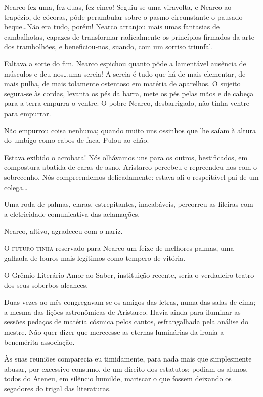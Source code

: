 Nearco fez uma, fez duas, fez cinco! Seguiu{}-se
uma viravolta, e Nearco ao trapézio, de cócoras, pôde perambular sobre
o pasmo circunstante o pausado beque\ldots Não era tudo, porém! Nearco
arranjou mais umas fantasias de cambalhotas, capazes de transformar
radicalmente os princípios firmados da arte dos trambolhões, e
beneficiou{}-nos, suando, com um sorriso triunfal. 

Faltava a sorte do
fim. Nearco espichou quanto pôde a lamentável ausência de músculos e
deu{}-nos\ldots uma sereia! A sereia é tudo que há de mais elementar, de
mais pulha, de mais tolamente ostentoso em matéria de aparelhos. O
sujeito segura{}-se às cordas, levanta os pés da barra, mete os pés
pelas mãos e de cabeça para a terra empurra o ventre. O pobre Nearco,
desbarrigado, não tinha ventre para empurrar. 

Não empurrou coisa
nenhuma; quando muito uns ossinhos que lhe saíam à altura do umbigo
como cabos de faca. Pulou ao chão. 

Estava exibido o acrobata! Nós
olhávamos uns para os outros, bestificados, em compostura abatida de
caras{}-de{}-asno. Aristarco percebeu e repreendeu{}-nos com o
sobrecenho. Nós compreendemos delicadamente: estava ali o respeitável
pai de um colega\ldots 

Uma roda de palmas, claras, estrepitantes, inacabáveis, percorreu 
as fileiras com a eletricidade comunicativa das aclamações. 

Nearco, altivo, agradeceu com o nariz. 

\sectionitem

\noindent\textsc{O futuro tinha} reservado para Nearco um feixe de melhores palmas, uma
galhada de louros mais legítimos como tempero de vitória. 

O Grêmio Literário Amor ao Saber, instituição recente, seria o verdadeiro teatro
dos seus soberbos alcances. 

Duas vezes ao mês congregavam{}-se os
amigos das letras, numa das salas de cima; a mesma das lições
astronômicas de Aristarco. Havia ainda para iluminar as sessões pedaços
de matéria cósmica pelos cantos, esfrangalhada pela análise do mestre.
Não quer dizer que merecesse as eternas luminárias da ironia a
benemérita associação. 

Às suas reuniões comparecia eu timidamente, para
nada mais que simplesmente abusar, por excessivo consumo, de um direito
dos estatutos: podiam os alunos, todos do Ateneu, em silêncio humilde,
mariscar o que fossem deixando os segadores do trigal das literaturas.

